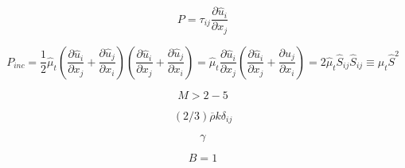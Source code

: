 \begin{equation}
P = \tau_{ij} \frac{\partial \hat u_i}{\partial x_j}
\end{equation}

\begin{equation}
P_{inc} =
  \frac{1}{2} \hat \mu_t \left( \frac{\partial \hat u_i}{\partial x_j}+ \frac{\partial \hat u_j}{\partial x_i} \right)
                         \left( \frac{\partial \hat u_i}{\partial x_j}+ \frac{\partial \hat u_j}{\partial x_i} \right) =
  \hat \mu_t \frac{\partial \hat u_i}{\partial x_j}
                         \left( \frac{\partial \hat u_i}{\partial x_j}+ \frac{\partial \hat u_j}{\partial x_i} \right) =
  2 \hat \mu_t \hat S_{ij} \hat S_{ij} \equiv \mu_t \hat S^2
\end{equation}

\begin{equation}
M > 2-5
\end{equation}

\begin{equation}
(2/3) \overline \rho k \delta_{ij}
\end{equation}

\begin{equation}
\gamma
\end{equation}

\begin{equation}
B=1
\end{equation}


